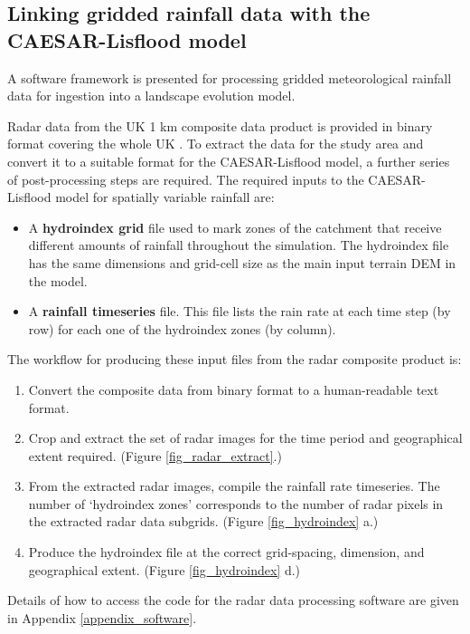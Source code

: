 \subsection{Linking gridded rainfall data with the CAESAR-Lisflood model}
A software framework is presented for processing gridded meteorological rainfall data for ingestion into a landscape evolution model.

Radar data from the UK 1 km composite data product is provided in binary format covering the whole UK \citep{metoffice2003nimrod}. To extract the data for the study area and convert it to a suitable format for the CAESAR-Lisflood model, a further series of post-processing steps are required. The required inputs to the CAESAR-Lisflood model for spatially variable rainfall are:

\begin{itemize}
\item A \textbf{hydroindex grid} file used to mark zones of the catchment that receive different amounts of rainfall throughout the simulation. The hydroindex file has the same dimensions and grid-cell size as the main input terrain DEM in the model.
\item A \textbf{rainfall timeseries} file. This file lists the rain rate at each time step (by row) for each one of the hydroindex zones (by column).
\end{itemize}

The workflow for producing these input files from the radar composite product is:
\begin{enumerate}
\item Convert the composite data from binary format to a human-readable text format.
\item Crop and extract the set of radar images for the time period and geographical extent required. (Figure \ref{fig_radar_extract}.)
\item From the extracted radar images, compile the rainfall rate timeseries. The number of `hydroindex zones' corresponds to the number of radar pixels in the extracted radar data subgrids. (Figure \ref{fig_hydroindex} a.)
\item Produce the hydroindex file at the correct grid-spacing, dimension, and geographical extent. (Figure \ref{fig_hydroindex} d.)
\end{enumerate}

Details of how to access the code for the radar data processing software are given in Appendix \ref{appendix_software}.


